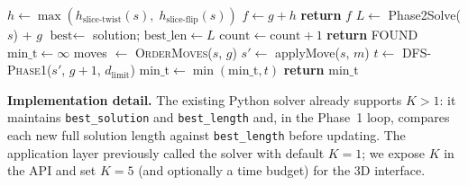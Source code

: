 \documentclass[conference]{IEEEtran}
\begin{document}
\begin{algorithm}[t]
\caption{\textsc{DFS-Phase1}($s$, $g$, $d_{\text{limit}}$)}
\label{alg:dfs-phase1}
\begin{algorithmic}[1]
\STATE $h \gets \max(h_{\text{slice-twist}}(s),\; h_{\text{slice-flip}}(s))$
\STATE $f \gets g + h$
  \STATE \textbf{return} $f$ 
\ENDIF
{} %
  \STATE $L \gets$ Phase2Solve($s$) + $g$
    \STATE $\text{best} \gets$ solution; $\text{best\_len} \gets L$
  \ENDIF
  \STATE $\text{count} \gets \text{count} + 1$
  \STATE \textbf{return} FOUND
\ENDIF
\STATE $\text{min\_t} \gets \infty$
\STATE moves $\gets$ \textsc{OrderMoves}($s$, $g$) 
  \STATE $s' \gets$ applyMove($s$, $m$)
  \STATE $t \gets$ \textsc{DFS-Phase1}($s'$, $g{+}1$, $d_{\text{limit}}$)
  \STATE $\text{min\_t} \gets \min(\text{min\_t}, t)$
\ENDFOR
\STATE \textbf{return} $\text{min\_t}$
\end{algorithmic}
\end{algorithm}

\textbf{Implementation detail.} The existing Python solver already supports $K>1$: it maintains \texttt{best\_solution} and \texttt{best\_length} and, in the Phase~1 loop, compares each new full solution length against \texttt{best\_length} before updating. The application layer previously called the solver with default $K=1$; we expose $K$ in the API and set $K=5$ (and optionally a time budget) for the 3D interface.
\end{document}
